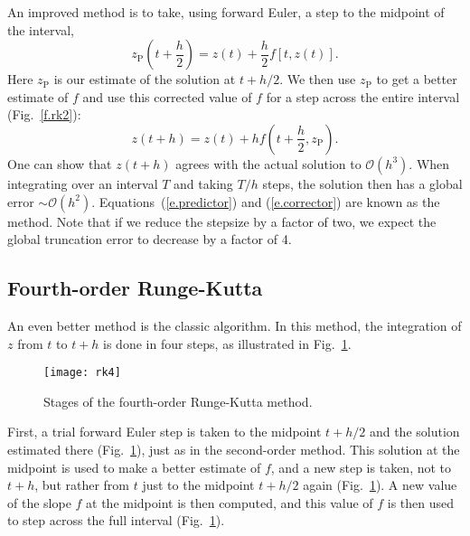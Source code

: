 An improved method is to take, using forward Euler, a step to the midpoint of the interval,
\begin{equation}\label{e.predictor}
z_{\mathrm{P}}\left(t+\frac{h}{2}\right) = z(t) + \frac{h}{2}f[t,z(t)].
\end{equation}
Here $z_{\mathrm{P}}$ is our estimate of the solution at $t+h/2$.
We then use $z_{\mathrm{P}}$ to get a better estimate of $f$ and use this corrected value of $f$ for a step across the entire interval (Fig.~\ref{f.rk2}):
\begin{equation}\label{e.corrector}
z(t+h) = z(t) + h f\left(t+\frac{h}{2},z_{\mathrm{P}}\right).
\end{equation}
One can show that $z(t+h)$ agrees with the actual solution to $\mathcal{O}(h^{3})$. When integrating over an interval $T$ and taking $T/h$ steps, the solution then has a global error $\sim\mathcal{O}(h^{2})$.  Equations~(\ref{e.predictor}) and (\ref{e.corrector}) are known as the  method. Note that if we reduce the stepsize by a factor of two, we expect the global truncation error to decrease by a factor of 4.

\subsection{Fourth-order Runge-Kutta}

An even better method is the classic  algorithm. In this method, the integration of $z$ from $t$ to $t+h$ is done in four steps, as illustrated in Fig.~\ref{f.rk4}.

\begin{figure}
\texttt{[image: rk4]}
\caption[The fourth-order Runge-Kutta method]{\label{f.rk4}
Stages of the fourth-order Runge-Kutta method.}
\end{figure}

First, a trial forward Euler step is taken to the midpoint $t+h/2$ and the solution estimated there (Fig.~\ref{f.rk4}), just as in the second-order method.
This solution at the midpoint is used to make a better estimate of $f$, and a new step is taken, not to $t+h$, but rather from $t$ just to the midpoint $t+h/2$ again (Fig.~\ref{f.rk4}).
A new value of the slope $f$ at the midpoint is then computed, and this value of $f$ is then used to step across the full interval (Fig.~\ref{f.rk4}).

